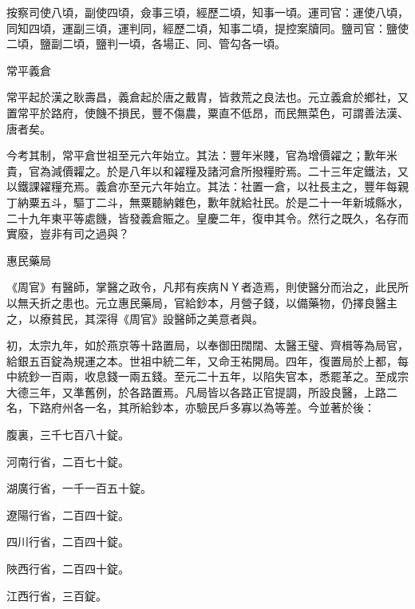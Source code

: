 \begin{pinyinscope}
 按察司使八頃，副使四頃，僉事三頃，經歷二頃，知事一頃。運司官：運使八頃，同知四頃，運副三頃，運判同，經歷二頃，知事二頃，提控案牘同。鹽司官：鹽使二頃，鹽副二頃，鹽判一頃，各場正、同、管勾各一頃。



 常平義倉



 常平起於漢之耿壽昌，義倉起於唐之戴胄，皆救荒之良法也。元立義倉於鄉社，又置常平於路府，使饑不損民，豐不傷農，粟直不低昂，而民無菜色，可謂善法漢、唐者矣。



 今考其制，常平倉世祖至元六年始立。其法：豐年米賤，官為增價糴之；歉年米貴，官為減價糶之。於是八年以和糴糧及諸河倉所撥糧貯焉。二十三年定鐵法，又以鐵課糴糧充焉。義倉亦至元六年始立。其法：社置一倉，以社長主之，豐年每親丁納粟五斗，驅丁二斗，無粟聽納雜色，歉年就給社民。於是二十一年新城縣水，二十九年東平等處饑，皆發義倉賑之。皇慶二年，復申其令。然行之既久，名存而實廢，豈非有司之過與？



 惠民藥局



 《周官》有醫師，掌醫之政令，凡邦有疾病ＮＹ者造焉，則使醫分而治之，此民所以無夭折之患也。元立惠民藥局，官給鈔本，月營子錢，以備藥物，仍擇良醫主之，以療貧民，其深得《周官》設醫師之美意者與。



 初，太宗九年，如於燕京等十路置局，以奉御田闊闊、太醫王璧、齊楫等為局官，給銀五百錠為規運之本。世祖中統二年，又命王祐開局。四年，復置局於上都，每中統鈔一百兩，收息錢一兩五錢。至元二十五年，以陷失官本，悉罷革之。至成宗大德三年，又準舊例，於各路置焉。凡局皆以各路正官提調，所設良醫，上路二名，下路府州各一名，其所給鈔本，亦驗民戶多寡以為等差。今並著於後：



 腹裏，三千七百八十錠。



 河南行省，二百七十錠。



 湖廣行省，一千一百五十錠。



 遼陽行省，二百四十錠。



 四川行省，二百四十錠。



 陜西行省，二百四十錠。



 江西行省，三百錠。




\end{pinyinscope}
